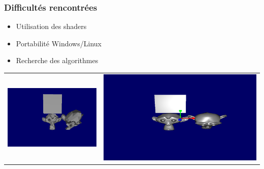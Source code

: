 \documentclass{beamer}
\begin{document}

\begin{frame}
\frametitle{Difficultés rencontrées}
\begin{itemize}[label=$\bullet$]
\item Utilisation des shaders
\item Portabilité Windows/Linux
\item Recherche des algorithmes
\end{itemize}
\begin{tabular}{l|r}
\includegraphics[scale=0.315]{rendu_sans_shader.png}
&
\includegraphics[scale=0.20]{singe_shaders.png}
\end{tabular}
\end{frame}

\end{document}
